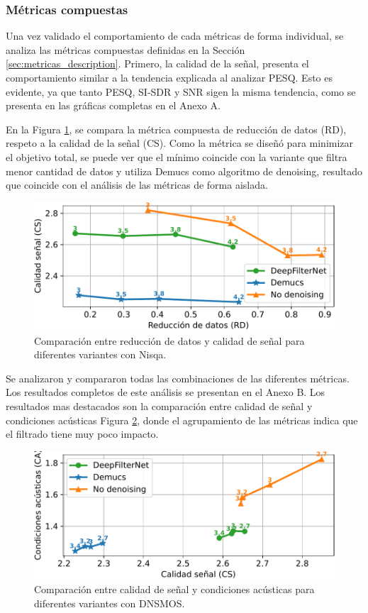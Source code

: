 \subsubsection{Métricas compuestas}
Una vez validado el comportamiento de cada métricas de forma individual, se analiza las métricas compuestas definidas en la Sección \ref{sec:metricas_description}. Primero, la calidad de la señal, presenta el comportamiento similar a la tendencia explicada al analizar PESQ. Esto es evidente, ya que tanto PESQ, SI-SDR y SNR sigen la misma tendencia, como se presenta en las gráficas completas en el Anexo A.

En la Figura \ref{fig:RD_vs_CS}, se compara la métrica compuesta de reducción de datos (RD), respeto a la calidad de la señal (CS). Como la métrica se diseñó para minimizar el objetivo total, se puede ver que el mínimo coincide con la variante que filtra menor cantidad de datos y utiliza Demucs como algoritmo de denoising, resultado que coincide con el análisis de las métricas de forma aislada.

\begin{figure}[h]
  \centering
  \centerline{\includegraphics[width=12cm]{Figuras/Pipeline/RD vs CS (nisqa).pdf}}
  \caption{Comparación entre reducción de datos y calidad de señal para diferentes variantes con Nisqa.}
    \label{fig:RD_vs_CS}
\end{figure}

Se analizaron y compararon todas las combinaciones de las diferentes métricas. Los resultados completos de este análisis se presentan en el Anexo B. Los resultados mas destacados son la comparación entre calidad de señal y condiciones acústicas Figura \ref{fig:CS_vs_CA}, donde el agrupamiento de las métricas indica que el filtrado tiene muy poco impacto.

\begin{figure}[h]
  \centering
  \centerline{\includegraphics[width=12cm]{Figuras/Pipeline/CS vs CA (dnsmos).pdf}}
  \caption{Comparación entre calidad de señal y condiciones acústicas para diferentes variantes con DNSMOS.}
    \label{fig:CS_vs_CA}
\end{figure}

